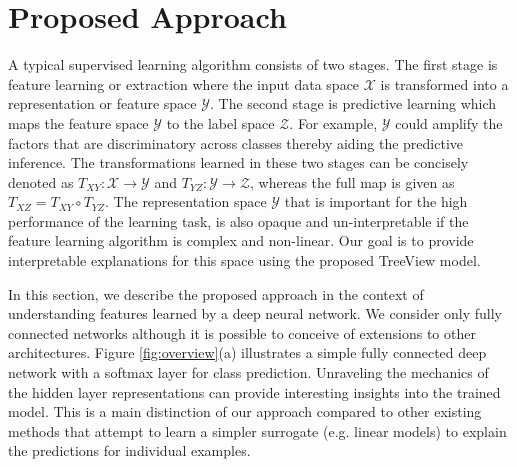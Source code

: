 \documentclass[final]{article}
\begin{document}

\section{Proposed Approach}
A typical supervised learning algorithm consists of two stages. The first stage is feature learning or extraction where the input data space $\mathcal{X}$ is transformed into a representation or feature space $\mathcal{Y}$. The second stage is predictive learning which maps the feature space $\mathcal{Y}$ to the label space $\mathcal{Z}$. For example, $\mathcal{Y}$ could amplify the factors that are discriminatory across classes thereby aiding the predictive inference. The transformations learned in these two stages can be concisely denoted as $T_{XY}: \mathcal{X} \rightarrow \mathcal{Y}$ and $T_{YZ}: \mathcal{Y} \rightarrow \mathcal{Z}$, whereas the full map is given as $T_{XZ} = T_{XY} \circ T_{YZ}$. The representation space $\mathcal{Y}$ that is important for the high performance of the learning task, is also opaque and un-interpretable if the feature learning algorithm is complex and non-linear. Our goal is to provide interpretable explanations for this space using the proposed TreeView model.

In this section, we describe the proposed approach in the context of understanding features learned by a deep neural network. We consider only fully connected networks although it is possible to conceive of extensions to other architectures. Figure \ref{fig:overview}(a) illustrates a simple fully connected deep network with a softmax layer for class prediction. Unraveling the mechanics of the hidden layer representations can provide interesting insights into the trained model. This is a main distinction of our approach compared to other existing methods that attempt to learn a simpler surrogate (e.g. linear models) to explain the predictions for individual examples.
 
\end{document}
